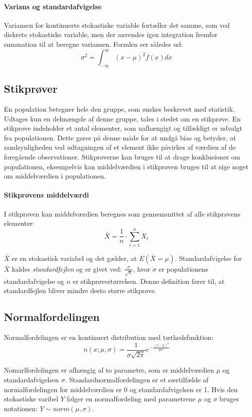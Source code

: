 \paragraph{Varians og standardafvigelse} Variansen for kontinuerte stokastiske variable fortæller det samme, som ved diskrete stokastiske variable, men der anvendes igen integration fremfor summation til at beregne variansen. Formlen ser således ud:
$$\sigma^2=\int_{-\infty}^{\infty}(x-\mu)^2f(x)dx$$ 


\subsection{Stikprøver}
En population betegner hele den gruppe, som ønskes beskrevet med statistik. Udtages kun en delmængde af denne gruppe, tales i stedet om en stikprøve.
En stikprøve indeholder et antal elementer, som uafhængigt og tilfældigt er udvalgt fra populationen. Dette gøres på denne måde for at undgå bias og betyder, at sandsynligheden ved udtagningen af et element ikke påvirkes af værdien af de foregående observationer.
Stikprøverne kan bruges til at drage konklusioner om populationen, eksempelvis kan middelværdien i stikprøven bruges til at sige noget om middelværdien i populationen. 

\paragraph{Stikprøvens middelværdi} I stikprøven kan middelværdien beregnes som gennemsnittet af alle stikprøvens elementer:
$$\bar{X}=\frac{1}{n} \cdot \sum_{i=1}^{n} X_i $$

$\bar{X}$ er en stokastisk variabel og det gælder, at $E(\bar{X}=\mu)$.\newline
Standardafvigelse for $\bar{X}$ kaldes \emph{standardfejlen} og er givet ved: $\frac{\sigma}{\sqrt{n}}$, hvor $\sigma$ er populationens standardafvigelse og $n$ er stikprøvestørrelsen. Denne definition fører til, at standardfejlen bliver mindre desto større stikprøve.


\subsection{Normalfordelingen}
Normalfordelingen er en kontinuert distribution med tæthedsfunktion:
$$n(x;\mu, \sigma)=\frac{1}{\sigma\sqrt{2\pi}}e^{-\frac{(x-\mu)^2}{2\sigma^2}}$$

Nomarlfordelingen er afhængig af to parametre, som er middelværdien $\mu$ og standardafvigelsen $\sigma$.
Standardnormalfordelingen er et særtilfælde af normalfordelingen for middelværdien er 0 og standardafvigelsen er 1.
Hvis den stokastiske varibel $Y$ følger en normalfordeling med parametrene $\mu$ og $\sigma$ bruges notationen:
$Y \sim norm(\mu,\sigma)$.

